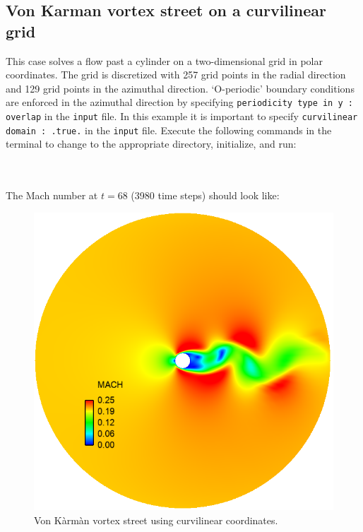 \documentclass[12pt]{article}
\newcommand{\code}[1]{\texttt{#1}}
\begin{document}
\subsection{Von Karman vortex street on a curvilinear grid}
This case solves a flow past a cylinder on a two-dimensional grid in polar coordinates. The grid is discretized with 257 grid points in the radial direction and 129 grid points in the azimuthal direction. `O-periodic' boundary conditions are enforced in the azimuthal direction by specifying \code{periodicity type in y : overlap} in the \code{input} file. In this example it is important to specify \code{curvilinear domain : .true.} in the \code{input} file. Execute the following commands in the terminal to change to the appropriate directory, initialize, and run:
\\\\
\vspace{1em}
\vspace{.5em}
\\
The Mach number at $t=68$ (3980 time steps) should look like:
 \begin{figure}[h]
	\begin{center}
		\includegraphics[scale=0.3]{fig/von_karman}
		\caption{Von K\`arm\`an vortex street using curvilinear coordinates.}
		\label{fig:sod}
	\end{center}
\end{figure}
\end{document}
